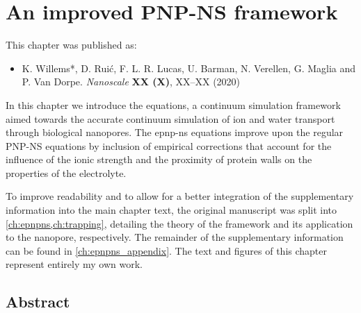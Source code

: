 \chapter{An improved PNP-NS framework}
%
\label{ch:epnpns}
%


%
%
\begin{shaded}
This chapter was published as:
%
\begin{itemize}
  \item K. Willems*, D. Rui\'{c}, F. L. R. Lucas, U. Barman, N. Verellen, G. Maglia and P. Van Dorpe.
        \textit{Nanoscale} \textbf{XX (X)}, XX--XX (2020) %
\end{itemize}
%
\newpage
\end{shaded}
%
%

%

In this chapter we introduce the  equations, a continuum simulation framework aimed towards
the accurate continuum simulation of ion and water transport through biological nanopores. The \gls{epnp-ns}
equations improve upon the regular {PNP-NS} equations by inclusion of empirical corrections that account for
the influence of the ionic strength and the proximity of protein walls on the properties of the electrolyte.
%

%
To improve readability and to allow for a better integration of the supplementary information into the main
chapter text, the original manuscript was split into \cref{ch:epnpns,ch:trapping}, detailing the theory of the
framework and its application to the  nanopore, respectively. The remainder of the
supplementary information can be found in \cref{ch:epnpns_appendix}. The text and figures of this chapter
represent entirely my own work.
%

%
%
%


\section{Abstract}
%
\label{sec:epnpns:abstract}
%

